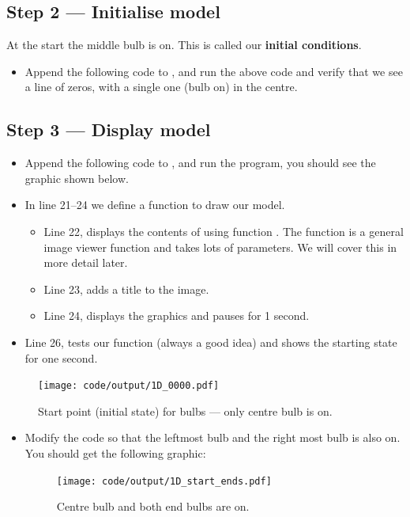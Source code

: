 \documentclass{coderdojo}
\newcommand\TODO[1]{
\begin{itemize}
\item[\todoSymbol] \color{todo} #1
\end{itemize}}
\begin{document}
\subsection{Step 2 --- Initialise model}

At the start the middle bulb is on. This is called our {\bf initial conditions}.

\TODO{Append the following code to , and run the above code and verify that we see a line of zeros, with a single one (bulb on) in the centre.}



\subsection{Step 3 --- Display model}

\TODO{Append the following code to , and run the program, you should see the graphic shown below.}


\begin{itemize}
\item In line 21--24 we define a function to draw our model.  
\begin{itemize}
\item
Line 22, displays the contents of  using function . The function  is a general image viewer function and takes lots of parameters. We will cover this in more detail later.
\item
Line 23, adds a title to the image.
\item
Line 24, displays the graphics and pauses for 1 second.
\end{itemize}
\item 
Line 26, tests our function (always a good idea) and shows the starting state for one second.
\end{itemize}
\begin{figure}[H]\centering
\texttt{[image: code/output/1D\_0000.pdf]}
\caption{Start point (initial state) for bulbs --- only centre bulb is on.}
\end{figure}


\TODO{Modify the code so that the leftmost bulb and the right most bulb is also on. You should get the following graphic:
\begin{figure}[H]\centering
\texttt{[image: code/output/1D\_start\_ends.pdf]}
\caption{Centre bulb and both end bulbs are on.}
\end{figure} 
}
\end{document}
